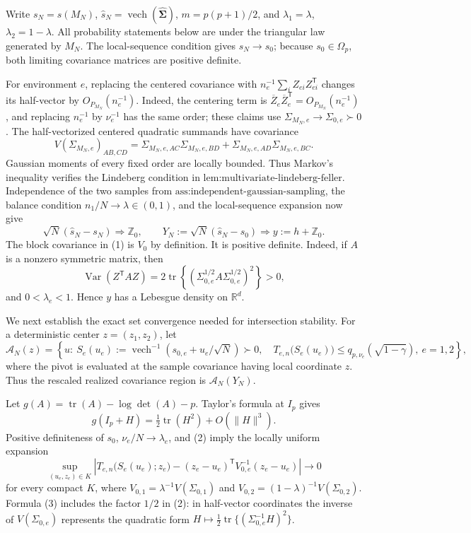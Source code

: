 Write \(s_N=s(M_N)\), \(\widehat s_N=\operatorname{vech}(\widehat{\boldsymbol\Sigma})\), \(m=p(p+1)/2\), and \(\lambda_1=\lambda\), \(\lambda_2=1-\lambda\).  All probability statements below are under the triangular law generated by \(M_N\).  The local-sequence condition gives \(s_N\to s_0\); because \(s_0\in\Omega_p\), both limiting covariance matrices are positive definite.

For environment \(e\), replacing the centered covariance with \(n_e^{-1}\sum_iZ_{ei}Z_{ei}^{\mathsf T}\) changes its half-vector by \(O_{P_{M_N}}(n_e^{-1})\).  Indeed, the centering term is \(\overline Z_e\overline Z_e^{\mathsf T}=O_{P_{M_N}}(n_e^{-1})\), and replacing \(n_e^{-1}\) by \(\nu_e^{-1}\) has the same order; these claims use \(\Sigma_{M_N,e}\to\Sigma_{0,e}\succ0\).  The half-vectorized centered quadratic summands have covariance
\[
 V(\Sigma_{M_N,e})_{AB,CD}
 =\Sigma_{M_N,e,AC}\Sigma_{M_N,e,BD}
  +\Sigma_{M_N,e,AD}\Sigma_{M_N,e,BC}.
\]
Gaussian moments of every fixed order are locally bounded.  Thus Markov's inequality verifies the Lindeberg condition in \(\text{lem:multivariate-lindeberg-feller}\).  Independence of the two samples from \(\text{ass:independent-gaussian-sampling}\), the balance condition \(n_1/N\to\lambda\in(0,1)\), and the local-sequence expansion now give
\[
 \sqrt N(\widehat s_N-s_N)\Rightarrow\mathbb Z_0,
 \qquad
 Y_N:=\sqrt N(\widehat s_N-s_0)\Rightarrow y:=h+\mathbb Z_0. \tag{1}
\]
The block covariance in (1) is \(V_0\) by definition.  It is positive definite.  Indeed, if \(A\) is a nonzero symmetric matrix, then
\[
 \operatorname{Var}(Z^{\mathsf T}AZ)
 =2\operatorname{tr}\!\left\{(\Sigma_{0,e}^{1/2}A\Sigma_{0,e}^{1/2})^2\right\}>0,
\]
and \(0<\lambda_e<1\).  Hence \(y\) has a Lebesgue density on \(\mathbb R^d\).

We next establish the exact set convergence needed for intersection stability.  For a deterministic center \(z=(z_1,z_2)\), let
\[
 \mathcal A_N(z)=\left\{u:\ S_e(u_e):=
 \operatorname{vech}^{-1}(s_{0,e}+u_e/\sqrt N)\succ0,\quad
 T_{e,n}\bigl(S_e(u_e)\bigr)\le q_{p,\nu_e}(\sqrt{1-\gamma}),\ e=1,2\right\},
\]
where the pivot is evaluated at the sample covariance having local coordinate \(z\).  Thus the rescaled realized covariance region is \(\mathcal A_N(Y_N)\).

Let \(g(A)=\operatorname{tr}(A)-\log\det(A)-p\).  Taylor's formula at \(I_p\) gives
\[
 g(I_p+H)=\tfrac12\operatorname{tr}(H^2)+O(\lVert H\rVert^3). \tag{2}
\]
Positive definiteness of \(s_0\), \(\nu_e/N\to\lambda_e\), and (2) imply the locally uniform expansion
\[
 \sup_{(u_e,z_e)\in K}
 \left|T_{e,n}\bigl(S_e(u_e);z_e\bigr)
 -(z_e-u_e)^{\mathsf T}V_{0,e}^{-1}(z_e-u_e)\right|\longrightarrow0 \tag{3}
\]
for every compact \(K\), where
\(V_{0,1}=\lambda^{-1}V(\Sigma_{0,1})\) and
\(V_{0,2}=(1-\lambda)^{-1}V(\Sigma_{0,2})\).  Formula (3) includes the factor \(1/2\) in (2): in half-vector coordinates the inverse of \(V(\Sigma_{0,e})\) represents the quadratic form \(H\mapsto\tfrac12\operatorname{tr}\{(\Sigma_{0,e}^{-1}H)^2\}\).

